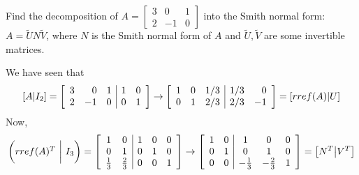 \documentclass[pdf,9pt]{beamer}
\begin{document}
\begin{frame}[fragile]
\begin{problem}
Find the decomposition of $A=\left[
    \begin{array}{rrr}
	3 & 0  & 1 \\
	2 & -1 & 0
    \end{array}\right]$
    into the Smith normal form: $A= \widetilde{U}N \widetilde{V}$, where $N$ is the Smith normal form of $A$
    and $\widetilde{U}, \widetilde{V}$ are some invertible matrices.
\end{problem}
\pause
\vfill
\begin{solution}
    We have seen that
    \[
	[A|I_2]= \left[\begin{array}{rrr|rr}
	    3 & 0  & 1 & 1 & 0 \\
	    2 & -1 & 0 & 0 & 1
	\end{array}\right]
	\rightarrow
	\left[\begin{array}{rrr|rr}
	    1 & 0 & 1/3 & 1/3 & 0 \\
	    0 & 1 & 2/3 & 2/3 & -1
	\end{array}\right]
	=
	[\mathop{rref}(A) | U]
    \]
    Now,
    \begin{align*}
	\begin{pmatrix} \mathop{rref}(A)^T~\bigg|~ I_3 \end{pmatrix}
	=
	\left[
	\begin{array}{cc|ccc}
	    1           & 0           & 1 & 0 & 0\\
	    0           & 1           & 0 & 1 & 0\\
	    \frac{1}{3} & \frac{2}{3} & 0 & 0 & 1\\
	\end{array}\right]
	\rightarrow
	\left[
	\begin{array}{cc|ccc}
	    1 & 0 & 1            & 0            & 0\\
	    0 & 1 & 0            & 1            & 0\\
	    0 & 0 & -\frac{1}{3} & -\frac{2}{3} & 1\\
	\end{array}\right]
    =
    \left[N^T \middle| V^T\right]
    \end{align*}
\end{solution}
\end{frame}
\end{document}
